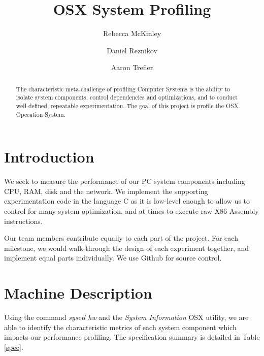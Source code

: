 \documentclass[sigconf]{acmart}
\begin{document}
\title{OSX System Profiling}

\author{Rebecca McKinley}

\author{Daniel Reznikov}


\author{Aaron Trefler}

\begin{abstract}
The characteristic meta-challenge of profiling Computer Systems is the ability to isolate system components, control dependencies and optimizations, and to conduct well-defined, repeatable experimentation. The goal of this project is profile the OSX Operation System.
\end{abstract}

\maketitle

\section{Introduction}
We seek to measure the performance of our PC system components including CPU, RAM, disk and the network. We implement the supporting experimentation code in the language C as it is low-level enough to allow us to control for many system optimization, and at times to execute raw X86 Assembly instructions.

Our team members contribute equally to each part of the project. For each milestone, we would walk-through the design of each experiment together, and implement equal parts individually. We use Github for source control.


\section{Machine Description} 
Using the command \textit{sysctl hw} and the \textit{System Information} OSX utility, we are able to identify the characteristic metrics of each system component which impacts our performance profiling. The specification summary is detailed in Table \ref{spec}.
\end{document}
